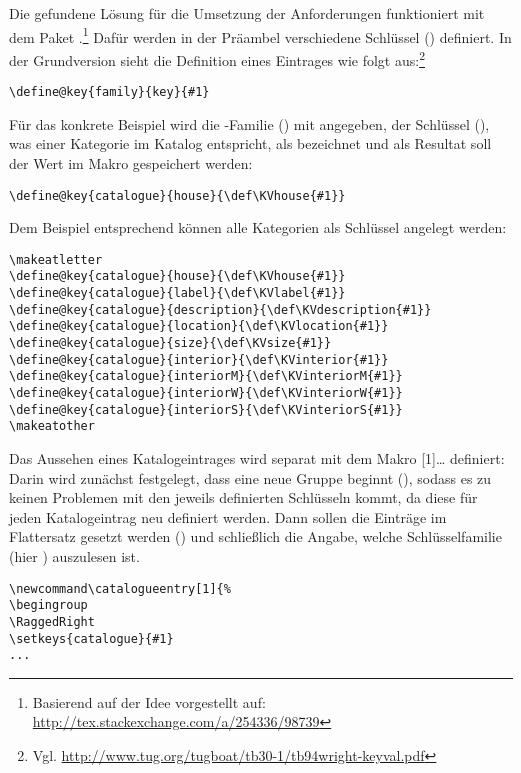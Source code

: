 \documentclass[ngerman]{dtk}
\makeatletter
\newcommand\catalogueentry[1]{%
\RaggedRight\begingroup
\setkeys{catalogue}{#1}%
\ifdef{\KVhouse}{\section{\KVhouse
			\ifdef{\KVlabel}{\label{\KVlabel}}{}}
			}{}%
\begin{labeling}{Beschreibung}
\ifdef{\KVdescription}{\item[Beschreibung] \KVdescription}{}%
\ifdef{\KVlocation}{\item[Verortung] \KVlocation}{}%
\ifdef{\KVinterior}{%
	\item[Ausstattung] \KVinterior %
	\ifboolexpr{bool{@KVinteriorM} or bool {@KVinteriorW} or bool {@KVinteriorS}}{%
	\begin{labeling}{Wandgemälde}
			\ifdef{\KVinteriorM}{\item[Mosaike:] \KVinteriorM}{}
			\ifdef{\KVinteriorW}{\item[Wandgemälde:] \KVinteriorW}{}
			\ifdef{\KVinteriorS}{\item[Statuen:] \KVinteriorS}{}
			\end{labeling}
		}{}}%
	{%
	\ifboolexpr{bool{@KVinteriorM} or bool {@KVinteriorW} or bool {@KVinteriorS}}{%
		\item[Ausstattung]%
	\begin{labeling}{Wandgemälde}	
				\ifdef{\KVinteriorM}{\item[Mosaike:] \KVinteriorM}{}
				\ifdef{\KVinteriorW}{\item[Wandgemälde:] \KVinteriorW}{}
				\ifdef{\KVinteriorS}{\item[Statuen:] \KVinteriorS}{}
			\end{labeling}
	}{}}%
\ifdef{\KVsize}{	\item[Größe] \SI{\KVsize}{\meter\squared}}{}%
\ifdef{\KVliterature}{\item[Erwähnungen]S.\ \KVliterature}{}%
\end{labeling}
\endgroup
}
\makeatother
\begin{document}
Die gefundene Lösung für die Umsetzung der Anforderungen funktioniert mit dem Paket .\footnote{Basierend auf der Idee vorgestellt auf: \url{http://tex.stackexchange.com/a/254336/98739}}
Dafür werden in der Präambel verschiedene Schlüssel () definiert.
In der Grundversion sieht die Definition eines Eintrages wie folgt aus:\footnote{Vgl. \url{http://www.tug.org/tugboat/tb30-1/tb94wright-keyval.pdf}}
\begin{lstlisting}[style=noNumber]
\define@key{family}{key}{#1}
\end{lstlisting}
Für das konkrete Beispiel wird die -Familie () mit  angegeben,
der Schlüssel (), was einer Kategorie im Katalog entspricht, 
als  bezeichnet und als Resultat soll der Wert im Makro  gespeichert werden:
\begin{lstlisting}[style=noNumber]
\define@key{catalogue}{house}{\def\KVhouse{#1}}
\end{lstlisting}
Dem Beispiel entsprechend können alle Kategorien als Schlüssel angelegt werden:
\begin{lstlisting}[style=number]
\makeatletter
\define@key{catalogue}{house}{\def\KVhouse{#1}}
\define@key{catalogue}{label}{\def\KVlabel{#1}}
\define@key{catalogue}{description}{\def\KVdescription{#1}}
\define@key{catalogue}{location}{\def\KVlocation{#1}}
\define@key{catalogue}{size}{\def\KVsize{#1}}
\define@key{catalogue}{interior}{\def\KVinterior{#1}}
\define@key{catalogue}{interiorM}{\def\KVinteriorM{#1}}
\define@key{catalogue}{interiorW}{\def\KVinteriorW{#1}}
\define@key{catalogue}{interiorS}{\def\KVinteriorS{#1}}
\makeatother
\end{lstlisting}
Das Aussehen eines Katalogeintrages wird separat mit dem Makro
 [1]{\ldots} 
definiert:
Darin wird zunächst festgelegt,
dass eine neue Gruppe beginnt (), sodass
es zu keinen Problemen mit den jeweils definierten Schlüsseln kommt, 
da diese für jeden Katalogeintrag neu definiert werden.
Dann sollen die  Einträge im Flattersatz gesetzt werden () und schließlich die Angabe,
 welche Schlüsselfamilie (hier ) auszulesen ist.
\begin{lstlisting}[style=number]
\newcommand\catalogueentry[1]{%
\begingroup
\RaggedRight
\setkeys{catalogue}{#1}
...
\end{lstlisting}
\end{document}
